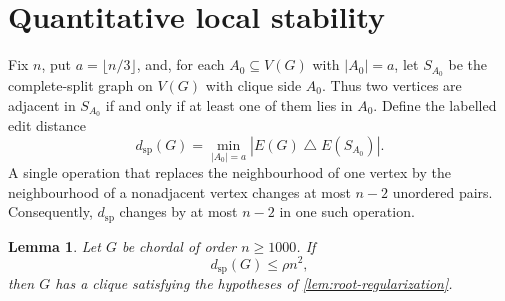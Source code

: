 \documentclass[11pt,reqno]{amsart}
\numberwithin{equation}{section}
\newtheorem{lemma}[theorem]{Lemma}
\theoremstyle{definition}
\theoremstyle{remark}
\newcommand{\distsp}{d_{\mathrm{sp}}}
\begin{document}
\section{Quantitative local stability}

Fix $n$, put $a=\lfloor n/3\rfloor$, and, for each $A_0\subseteq V(G)$ with
$|A_0|=a$, let $S_{A_0}$ be the complete-split graph on $V(G)$ with clique
side $A_0$.  Thus two vertices are adjacent in $S_{A_0}$ if and only if at
least one of them lies in $A_0$.  Define the labelled edit distance
\begin{equation}\label{eq:edit-distance}
  \distsp(G)=\min_{|A_0|=a}
    |E(G)\mathbin{\triangle}E(S_{A_0})|.
\end{equation}
A single operation that replaces the neighbourhood of one vertex by the
neighbourhood of a nonadjacent vertex changes at most $n-2$ unordered pairs.
Consequently, $\distsp$ changes by at most $n-2$ in one such operation.

\begin{lemma}\label{lem:local-root}
Let $G$ be chordal of order $n\geq1000$.  If
\[
  \distsp(G)\leq\rho n^2,
\]
then $G$ has a clique satisfying the hypotheses of
\cref{lem:root-regularization}.
\end{lemma}
\end{document}
